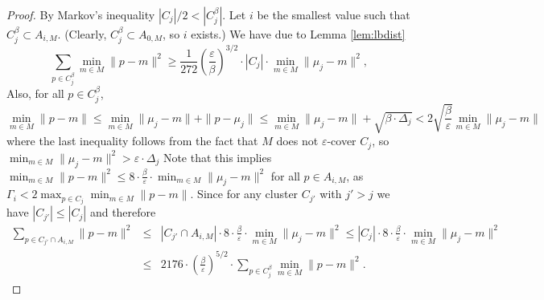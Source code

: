 \documentclass[11pt]{article}
\begin{document}
\begin{proof}
By Markov's inequality $|C_j|/2 < |C_j^\beta|$.
Let $i$ be the smallest value such that $C_j^{\beta} \subset A_{i,M}$. (Clearly, $C_j^{\beta} \subset A_{0,M}$, so $i$ exists.)
We have due to Lemma \ref{lem:lbdist}
$$\sum_{p\in C_j^\beta} \min_{m\in M}\|p-m\|^2 \geq \frac{1}{272}\left(\frac{\varepsilon}{\beta}\right)^{3/2}\cdot |C_j| \cdot \min_{m\in M}\|\mu_j-m\|^2,$$
Also, for all $p\in C_j^\beta$,
$$ \min_{m\in M}\|p-m\| \leq \min_{m\in M}\|\mu_j-m\| + \|p-\mu_j\| \leq \min_{m\in M}\|\mu_j-m\| + \sqrt{\beta \cdot \Delta_j} < 2\sqrt{\frac{\beta}{\varepsilon}} \min_{m\in M}\|\mu_j-m\|$$
where the last inequality follows from the fact that $M$ does not $\varepsilon$-cover $C_j$, so 
$\min_{m\in M}\|\mu_j-m\|^2 > \varepsilon\cdot \Delta_j$
Note that this implies $\min_{m\in M}\|p - m\|^2 \leq 8\cdot \frac{\beta}{\varepsilon} \cdot \min_{m\in M}\|\mu_j-m\|^2$ for all $p\in A_{i,M}$, as $\Gamma_i < 2\max_{p\in C_j}\min_{m\in M}\|p-m\|$.
Since for any cluster $C_{j'}$ with $j'>j$ we have $|C_{j'}|\leq |C_j|$ and therefore 
\begin{eqnarray}
  \sum_{p\in C_{j'}\cap A_{i,M}} \|p-m\|^2 
&\leq& |C_{j'}\cap A_{i,M}| \cdot 8\cdot \frac{\beta}{\varepsilon} \cdot 
   \min_{m\in M}\|\mu_j-m\|^2\leq |C_j| \cdot 8\cdot \frac{\beta}{\varepsilon} \cdot \min_{m\in M}\|\mu_j-m\|^2\nonumber \\
&\leq& 2176\cdot \left(\frac{\beta}{\varepsilon}\right)^{5/2} \cdot \sum_{p\in C_j^\beta}\min_{m\in M}\|p-m\|^2.
\label{eq: smaller clusters}
\end{eqnarray}


\end{proof}
\end{document}
